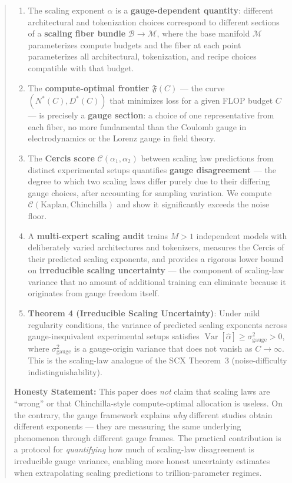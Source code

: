 \documentclass[12pt,a4paper]{article}
\theoremstyle{remark}
\DeclareMathOperator{\Var}{Var}
\newcommand{\cercis}{\mathcal{C}}
\newcommand{\Frontier}{\mathfrak{F}}
\begin{document}
\begin{abstract}
\begin{enumerate}[label=(\roman*)]
    \item The scaling exponent $\alpha$ is a \textbf{gauge-dependent quantity}: different architectural and tokenization choices correspond to different sections of a \textbf{scaling fiber bundle} $\mathcal{B} \to \mathcal{M}$, where the base manifold $\mathcal{M}$ parameterizes compute budgets and the fiber at each point parameterizes all architectural, tokenization, and recipe choices compatible with that budget.
    \item The \textbf{compute-optimal frontier} $\Frontier(C)$ — the curve $(N^*(C), D^*(C))$ that minimizes loss for a given FLOP budget $C$ — is precisely a \textbf{gauge section}: a choice of one representative from each fiber, no more fundamental than the Coulomb gauge in electrodynamics or the Lorenz gauge in field theory.
    \item The \textbf{Cercis score} $\cercis(\alpha_1, \alpha_2)$ between scaling law predictions from distinct experimental setups quantifies \textbf{gauge disagreement} — the degree to which two scaling laws differ purely due to their differing gauge choices, after accounting for sampling variation. We compute $\cercis(\text{Kaplan}, \text{Chinchilla})$ and show it significantly exceeds the noise floor.
    \item A \textbf{multi-expert scaling audit} trains $M > 1$ independent models with deliberately varied architectures and tokenizers, measures the Cercis of their predicted scaling exponents, and provides a rigorous lower bound on \textbf{irreducible scaling uncertainty} — the component of scaling-law variance that no amount of additional training can eliminate because it originates from gauge freedom itself.
    \item \textbf{Theorem 4 (Irreducible Scaling Uncertainty)}: Under mild regularity conditions, the variance of predicted scaling exponents across gauge-inequivalent experimental setups satisfies $\Var[\hat{\alpha}] \geq \sigma^2_{\text{gauge}} > 0$, where $\sigma^2_{\text{gauge}}$ is a gauge-origin variance that does not vanish as $C \to \infty$. This is the scaling-law analogue of the SCX Theorem~3 (noise-difficulty indistinguishability).
\end{enumerate}

\vspace{4pt}
\noindent\textbf{Honesty Statement:}
This paper does \emph{not} claim that scaling laws are ``wrong'' or that Chinchilla-style compute-optimal allocation is useless. On the contrary, the gauge framework explains \emph{why} different studies obtain different exponents — they are measuring the same underlying phenomenon through different gauge frames. The practical contribution is a protocol for \emph{quantifying} how much of scaling-law disagreement is irreducible gauge variance, enabling more honest uncertainty estimates when extrapolating scaling predictions to trillion-parameter regimes.


\end{abstract}
\end{document}
